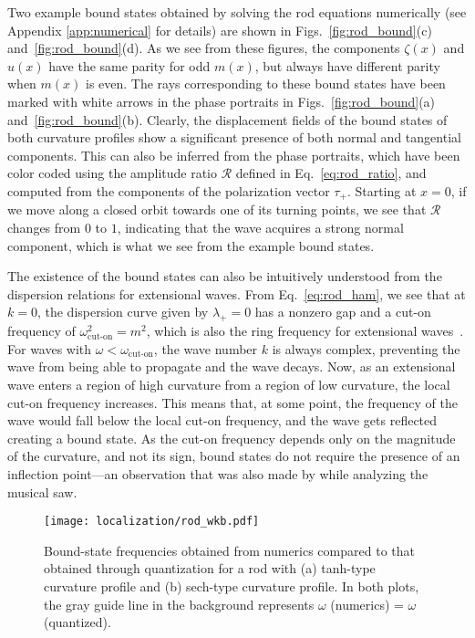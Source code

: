Two example bound states obtained by solving the rod equations numerically (see Appendix \ref{app:numerical} for details) are shown in Figs.~\ref{fig:rod_bound}(c) and~\ref{fig:rod_bound}(d).
  As we see from these figures, the components $\zeta(x)$ and $u(x)$ have the same parity for odd $m(x)$, but always have different parity when $m(x)$ is even.
  The rays corresponding to these bound states have been marked with white arrows in the phase portraits in Figs.~\ref{fig:rod_bound}(a) and~\ref{fig:rod_bound}(b).
  Clearly, the displacement fields of the bound states of both curvature profiles show a significant presence of both normal and tangential components.
This can also be inferred from the phase portraits, which have been color coded using the amplitude ratio $\mathscr{R}$ defined in Eq.~\eqref{eq:rod_ratio}, and computed from the components of the polarization vector $\tau_{+}$.
Starting at $x = 0$, if we move along a closed orbit towards one of its turning points, we see that $\mathscr{R}$ changes from $0$ to $1$, indicating that the wave acquires a strong normal component, which is what we see from the example bound states.

The existence of the bound states can also be intuitively understood from the dispersion relations for extensional waves.
From Eq.~\eqref{eq:rod_ham}, we see that at $k = 0$, the dispersion curve given by $\lambda_{+} = 0$ has a nonzero gap and a cut-on frequency of $\omega_{\text{cut-on}}^{2} = m^{2}$, which is also the ring frequency for extensional waves~\cite{walsh2000}.
For waves with $\omega < \omega_{\text{cut-on}}$, the wave number $k$ is always complex, preventing the wave from being able to propagate and the wave decays.
Now, as an extensional wave enters a region of high curvature from a region of low curvature, the local cut-on frequency increases.
This means that, at some point, the frequency of the wave would fall below the local cut-on frequency, and the wave gets reflected creating a bound state.
As the cut-on frequency depends only on the magnitude of the curvature, and not its sign, bound states do not require the presence of an inflection point---an observation that was also made by \citet{scott1992} while analyzing the musical saw.
%
\begin{figure}
  \begin{center}
    \texttt{[image: localization/rod\_wkb.pdf]}
  \end{center}
  \caption{
    Bound-state frequencies obtained from numerics compared to that obtained through quantization for a rod with (a) tanh-type curvature profile and (b) sech-type curvature profile.
    In both plots, the gray guide line in the background represents $\omega$ (numerics) = $\omega$ (quantized).
  }
  \label{fig:rod_wkb}
\end{figure}

